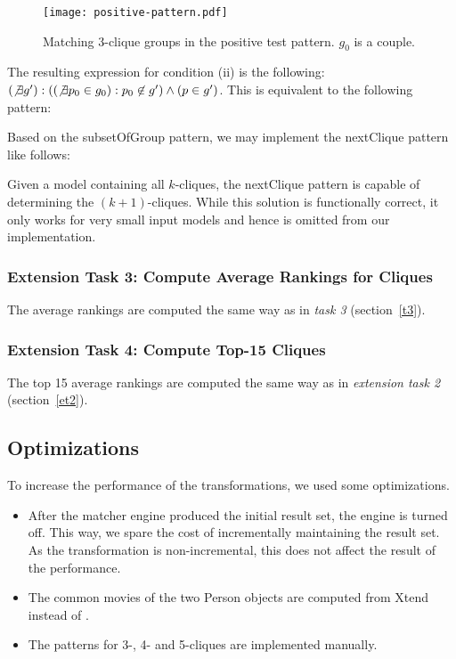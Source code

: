 \begin{figure}
	\centering
	\texttt{[image: positive-pattern.pdf]}
	\caption{Matching 3-clique groups in the positive test pattern. $g_0$ is a couple.}\label{fig:positive-pattern}
\end{figure}

The resulting expression for condition (ii) is the following: $\left(\not\exists g'\right): \left(\left(\not\exists p_0 \in g_0\right): p_0 \not\in g'\right) \wedge \left(p \in g'\right)$. This is equivalent to the following \incquery{} pattern:


Based on the \textsf{subsetOfGroup} pattern, we may implement the \textsf{nextClique} pattern like follows:


Given a model containing all $k$-cliques, the \textsf{nextClique} pattern is capable of determining the $(k+1)$-cliques. While this solution is functionally correct, it only works for very small input models and hence is omitted from our implementation.

\subsubsection{Extension Task 3: Compute Average Rankings for Cliques}
\label{et3}

The average rankings are computed the same way as in \emph{task 3} (section~\ref{t3}).

\subsubsection{Extension Task 4: Compute Top-15 Cliques}
\label{et4}

The top 15 average rankings are computed the same way as in \emph{extension task 2} (section~\ref{et2}).

\subsection{Optimizations}

To increase the performance of the transformations, we used some optimizations.

\begin{itemize}
  \item After the matcher engine produced the initial result set, the engine is turned off. This way, we spare the cost of incrementally maintaining the result set. As the transformation is non-incremental, this does not affect the result of the performance. 
  \item The common movies of the two \textsf{Person} objects are computed from Xtend instead of \incquery{}.
  \item The patterns for 3-, 4- and 5-cliques are implemented manually.
\end{itemize}
 
